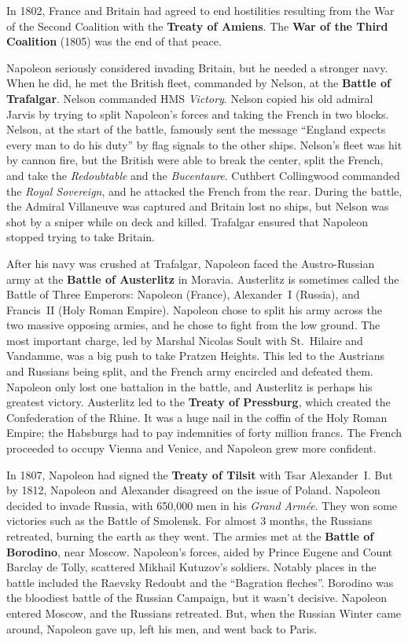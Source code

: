 In 1802, France and Britain had agreed to end hostilities resulting from the War of the Second Coalition
with the \textbf{Treaty of Amiens}.
The \textbf{War of the Third Coalition} (1805) was the end of that peace.

Napoleon seriously considered invading Britain, but he needed a stronger navy.
When he did, he met the British fleet, commanded by Nelson, at the \textbf{Battle of Trafalgar}.
Nelson commanded HMS \textit{Victory}.
Nelson copied his old admiral Jarvis by trying to split Napoleon's forces and taking the French in two blocks.
Nelson, at the start of the battle, famously sent the message
``England expects every man to do his duty'' by flag signals to the other ships.
Nelson's fleet was hit by cannon fire, but the British were able to break the center, split the French,
and take the \textit{Redoubtable} and the \textit{Bucentaure}.
Cuthbert Collingwood commanded the \textit{Royal Sovereign}, and he attacked the French from the rear.
During the battle, the Admiral Villaneuve was captured and Britain lost no ships,
but Nelson was shot by a sniper while on deck and killed.
Trafalgar ensured that Napoleon stopped trying to take Britain.

After his navy was crushed at Trafalgar,
Napoleon faced the Austro-Russian army at the \textbf{Battle of Austerlitz} in Moravia.
Austerlitz is sometimes called the Battle of Three Emperors:
Napoleon (France), Alexander~I (Russia), and Francis~II (Holy Roman Empire).
Napoleon chose to split his army across the two massive opposing armies, and he chose to fight from the low ground.
The most important charge, led by Marshal Nicolas Soult with St.\ Hilaire and Vandamme,
was a big push to take Pratzen Heights.
This led to the Austrians and Russians being split, and the French army encircled and defeated them.
Napoleon only lost one battalion in the battle, and Austerlitz is perhaps his greatest victory.
Austerlitz led to the \textbf{Treaty of Pressburg}, which created the Confederation of the Rhine.
It was a huge nail in the coffin of the Holy Roman Empire;
the Habsburgs had to pay indemnities of forty million francs.
The French proceeded to occupy Vienna and Venice, and Napoleon grew more confident.

In 1807, Napoleon had signed the \textbf{Treaty of Tilsit} with Tsar Alexander~I.
But by 1812, Napoleon and Alexander disagreed on the issue of Poland.
Napoleon decided to invade Russia, with 650,000 men in his \textit{Grand Arm\'ee}.
They won some victories such as the Battle of Smolensk.
For almost 3 months, the Russians retreated, burning the earth as they went.
The armies met at the \textbf{Battle of Borodino}, near Moscow.
Napoleon's forces, aided by Prince Eugene and Count Barclay de Tolly, scattered Mikhail Kutuzov's soldiers.
Notably places in the battle included the Raevsky Redoubt and the ``Bagration fleches''.
Borodino was the bloodiest battle of the Russian Campaign, but it wasn't decisive.
Napoleon entered Moscow, and the Russians retreated.
But, when the Russian Winter came around, Napoleon gave up, left his men, and went back to Paris.

